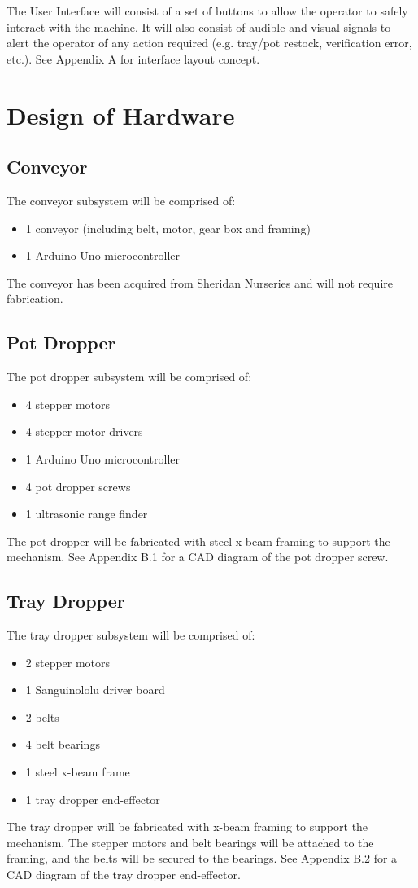 \documentclass[12pt, titlepage]{article}
\begin{document}
The User Interface will consist of a set of buttons to allow the operator to safely 
interact with the machine. It will also consist of audible and visual signals to alert
the operator of any action required (e.g. tray/pot restock, verification error, etc.).
See Appendix A for interface layout concept.

\section{Design of Hardware}

\subsection{Conveyor}

The conveyor subsystem will be comprised of:
\begin{itemize}
  \item 1 conveyor (including belt, motor, gear box and framing)
  \item 1 Arduino Uno microcontroller
  
\end{itemize}
The conveyor has been acquired from Sheridan Nurseries and will not require fabrication.


\subsection{Pot Dropper}

The pot dropper subsystem will be comprised of:
\begin{itemize}
  \item 4 stepper motors
  \item 4 stepper motor drivers
  \item 1 Arduino Uno microcontroller
  \item 4 pot dropper screws
  \item 1 ultrasonic range finder
\end{itemize}
The pot dropper will be fabricated with steel x-beam framing to support the mechanism.
See Appendix B.1 for a CAD diagram of the pot dropper screw.

\subsection{Tray Dropper}

The tray dropper subsystem will be comprised of:
\begin{itemize}
  \item 2 stepper motors
  \item 1 Sanguinololu driver board
  \item 2 belts
  \item 4 belt bearings
  \item 1 steel x-beam frame
  \item 1 tray dropper end-effector
\end{itemize}
The tray dropper will be fabricated with x-beam framing to support the mechanism. The 
stepper motors and belt bearings will be attached to the framing, and the belts will 
be secured to the bearings. See Appendix B.2 for a CAD diagram of the tray dropper 
end-effector.
\end{document}
